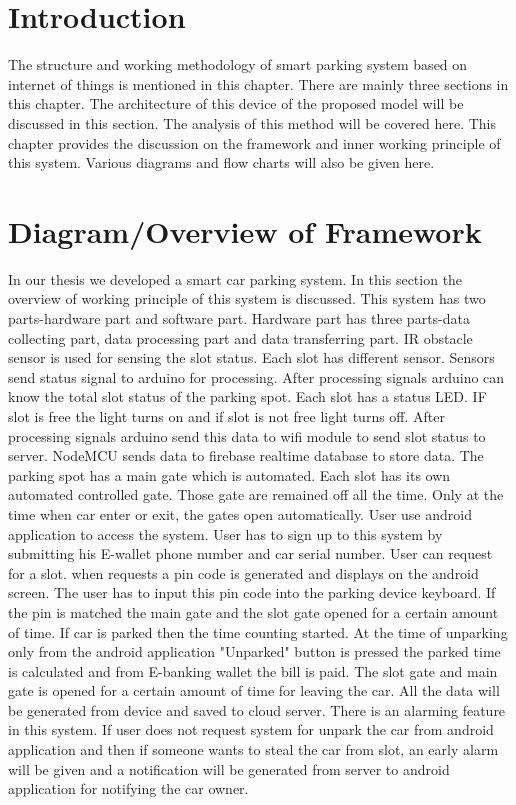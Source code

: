 \section{Introduction}
The structure and working methodology of smart parking system based on internet of things is mentioned in this chapter. There are mainly three sections in this chapter. The architecture of this device of the proposed model will be discussed in this section. The analysis of this method will be covered here. This chapter provides the discussion on the framework and inner working principle of this system. Various diagrams and flow charts will also be given here.

\section{Diagram/Overview of Framework}
In our thesis we developed a smart car parking system. In this section the overview of working principle of this system is discussed. This system has two parts-hardware part and software part. Hardware part has three parts-data collecting part, data processing part and data transferring part. IR obstacle sensor is used for sensing the slot status. Each slot has different sensor. Sensors send status signal to arduino for processing. After processing signals arduino can know the total slot status of the parking spot. Each slot has a status LED. IF slot is free the light turns on and if slot is not free light turns off. After processing signals arduino send this data to wifi module to send slot status to server. NodeMCU sends data to firebase realtime database to store data. The parking spot has a main gate which is automated. Each slot has its own automated controlled gate. Those gate are remained off all the time. Only at the time when car enter or exit, the gates open automatically. User use android application to access the system. User has to sign up to this system by submitting his E-wallet phone number and car serial number. User can request for a slot. when requests a pin code is generated and displays on the android screen. The user has to input this pin code into the parking device keyboard. If the pin is matched the main gate and the slot gate opened for a certain amount of time. If car is parked then the time counting started. At the time of unparking only from the android application "Unparked" button is pressed the parked time is calculated and from E-banking wallet the bill is paid. The slot gate and main gate is opened for a certain amount of time for leaving the car. All the data will be generated from device and saved to cloud server. There is an alarming feature in this system. If user does not request system for unpark the car from android application and then if someone wants to steal the car from slot, an early alarm will be given and a notification will be generated from server to android application for notifying the car owner.
